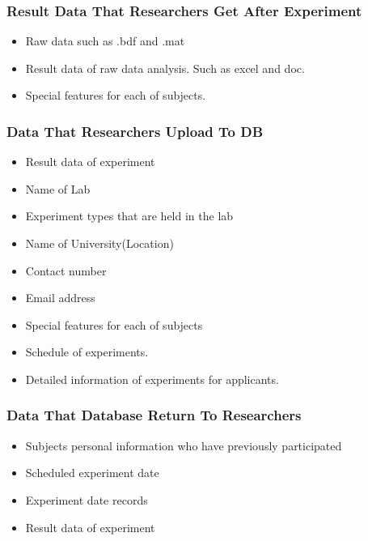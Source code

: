 \documentclass[letterpaper, 10 pt, conference]{ieeeconf}  %
\begin{document}
\subsubsection{\textbf{Result Data That Researchers Get After Experiment\\} }
\begin{itemize}
\item Raw data such as .bdf and .mat
\item Result data of raw data analysis. Such as excel and doc.
\item Special features for each of subjects.\\
\end{itemize}

\subsubsection{\textbf{Data That Researchers Upload To DB\\}}
\begin{itemize}
\item Result data of experiment
\item Name of Lab
\item Experiment types that are held in the lab
\item Name of University(Location)
\item Contact number 
\item Email address
\item Special features for each of subjects
\item Schedule of experiments.
\item Detailed information of experiments for applicants.\\
\end{itemize}

\subsubsection{\textbf{Data That Database Return To Researchers\\} }
\begin{itemize}
\item Subjects personal information who have previously participated
\item Scheduled experiment date
\item Experiment date records
\item Result data of experiment\\
\end{itemize}
\end{document}
